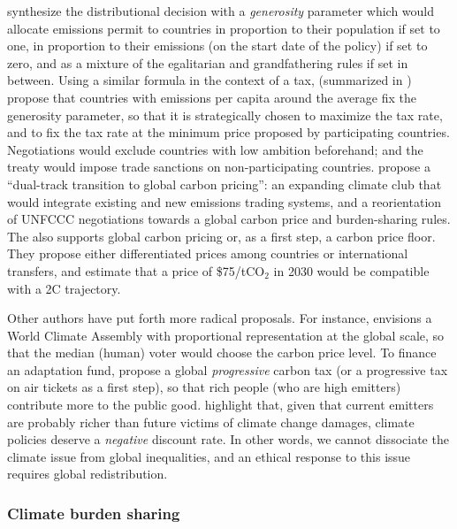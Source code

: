 \documentclass[12pt,english]{article}
\begin{document}
\citet{gollier_negotiating_2015} synthesize the distributional decision with a \textit{generosity} parameter which would allocate emissions permit to countries in proportion to their population if set to one, in proportion to their emissions (on the start date of the policy) if set to zero, and as a mixture of the egalitarian and grandfathering rules if set in between. Using a similar formula in the context of a tax, \citet{cramton_international_2015} (summarized in \citealp{mackay_price_2015}) propose that countries with emissions per capita around the average fix the generosity parameter, so that it is strategically chosen to maximize the tax rate, and to fix the tax rate at the minimum price proposed by participating countries. Negotiations would exclude countries with low ambition beforehand; and the treaty would impose trade sanctions on non-participating countries. %
\citet{bergh_dual-track_2020} propose a ``dual-track transition to global carbon pricing'': an expanding climate club that would integrate existing and new emissions trading systems, and a reorientation of UNFCCC negotiations towards a global carbon price and burden-sharing rules. 
The \citet{imf_how_2019} also supports global carbon pricing or, as a first step, a carbon price floor. They propose either differentiated prices among countries or international transfers, and estimate that a price of \$75/tCO$_\text{2}$ in 2030 would be compatible with a 2\textdegree{}C trajectory. %

Other authors have put forth more radical proposals. For instance, \citet{weitzman_world_2017} envisions a World Climate Assembly with proportional representation at the global scale, so that the median (human) voter would choose the carbon price level. %
To finance an adaptation fund, \citet{chancel_carbon_2015} propose a global \textit{progressive} carbon tax (or a progressive tax on air tickets as a first step), so that rich people (who are high emitters) contribute more to the public good. 
\citet{fleurbaey_climate_2013} highlight that, given that current emitters are probably richer than future victims of climate change damages, climate policies deserve a \textit{negative} discount rate. In other words, we cannot dissociate the climate issue from global inequalities, and an ethical response to this issue requires global redistribution. 

\subsubsection{Climate burden sharing}\label{subsubsec:literature_burden_sharing} 
\end{document}
